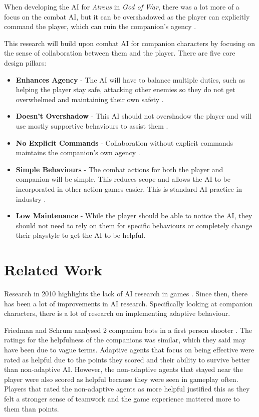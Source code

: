 \documentclass{IEEEtran}
\begin{document}
When developing the AI for \textit{Atreus} in \textit{God of War}, there was a lot more of a focus on the combat AI, but it can be overshadowed as the player can explicitly command the player, which can ruin the companion's agency \cite{EGXCharacterDeathGuildWars}.

This research will build upon combat AI for companion characters by focusing on the sense of collaboration between them and the player. There are five core design pillars:

\label{CoreDesign}
\begin{itemize}
	\item \textbf{Enhances Agency} - The AI will have to balance multiple duties, such as helping the player stay safe, attacking other enemies so they do not get overwhelmed and maintaining their own safety \cite{CoupledEmpowermentMaximisation, tremblay2013adaptive}.
	\item \textbf{Doesn't Overshadow} - This AI should not overshadow the player and will use mostly supportive behaviours to assist them \cite{CoupledEmpowermentMaximisation, DesignDocAIAllies}.
	\item \textbf{No Explicit Commands} - Collaboration without explicit commands maintains the companion's own agency \cite{EGXCharacterDeathGuildWars}.
	\item \textbf{Simple Behaviours} - The combat actions for both the player and companion will be simple. This reduces scope and allows the AI to be incorporated in other action games easier. This is standard AI practice in industry \cite{GMTGoodAI, GDCLessIsMore, GDCSimplestAITrick}.
	\item \textbf{Low Maintenance} - While the player should be able to notice the AI, they should not need to rely on them for specific behaviours or completely change their playstyle to get the AI to be helpful.
\end{itemize}

\section{Related Work}
\label{RelatedWork}

Research in 2010 highlights the lack of AI research in games \cite{RealTimeAICritique2010}. Since then, there has been a lot of improvements in AI research. Specifically looking at companion characters, there is a lot of research on implementing adaptive behaviour.

Friedman and Schrum analysed 2 companion bots in a first person shooter \cite{CompanionBotsFPS2019}. The ratings for the helpfulness of the companions was similar, which they said may have been due to vague terms. Adaptive agents that focus on being effective were rated as helpful due to the points they scored and their ability to survive better than non-adaptive AI. However, the non-adaptive agents that stayed near the player were also scored as helpful because they were seen in gameplay often. Players that rated the non-adaptive agents as more helpful justified this as they felt a stronger sense of teamwork and the game experience mattered more to them than points.
\end{document}
